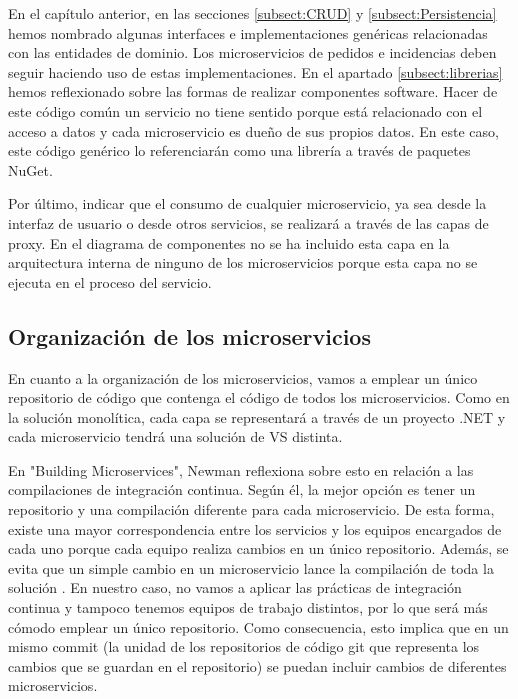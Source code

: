 \documentclass[11pt,spanish,listoffigures]{tfgetsinf}
\begin{document}
En el capítulo anterior, en las secciones \ref{subsect:CRUD}  y \ref{subsect:Persistencia}  hemos nombrado algunas interfaces e implementaciones genéricas relacionadas con las entidades de dominio. Los microservicios de pedidos e incidencias deben seguir haciendo uso de estas implementaciones. En el apartado \ref{subsect:librerias}  hemos reflexionado sobre las formas de realizar componentes software. Hacer de este código común un servicio no tiene sentido porque está relacionado con el acceso a datos y cada microservicio es dueño de sus propios datos. En este caso, este código genérico lo referenciarán como una librería a través de paquetes NuGet.

Por último, indicar que el consumo de cualquier microservicio, ya sea desde la interfaz de usuario o desde otros servicios, se realizará a través de las capas de proxy. En el diagrama de componentes no se ha incluido esta capa en la arquitectura interna de ninguno de los microservicios porque esta capa no se ejecuta en el proceso del servicio.

\subsection{Organización de los microservicios}

En cuanto a la organización de los microservicios, vamos a emplear un único repositorio de código que contenga el código de todos los microservicios. Como en la solución monolítica, cada capa se representará a través de un proyecto .NET y cada microservicio tendrá una solución de VS distinta.

En "Building Microservices", Newman reflexiona sobre esto en relación a las compilaciones de integración continua. Según él, la mejor opción es tener un repositorio y una compilación diferente para cada microservicio. De esta forma, existe una mayor correspondencia entre los servicios y los equipos encargados de cada uno porque cada equipo realiza cambios en un único repositorio. Además, se evita que un simple cambio en un microservicio lance la compilación de toda la solución \cite{Newman2015a}. En nuestro caso, no vamos a aplicar las prácticas de integración continua y tampoco tenemos equipos de trabajo distintos, por lo que será más cómodo emplear un único repositorio. Como consecuencia, esto implica que en un mismo commit (la unidad de los repositorios de código git que representa los cambios que se guardan en el repositorio) se puedan incluir cambios de diferentes microservicios.
\end{document}
